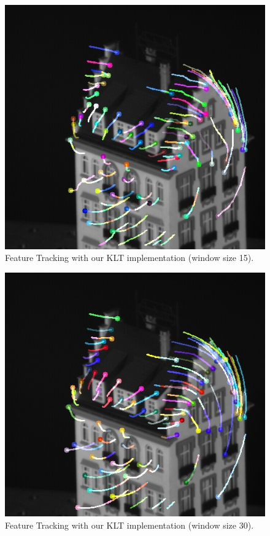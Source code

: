 \documentclass[]{IEEEtran}
\begin{document}
\begin{figure}[h]
  \includegraphics[width=\linewidth]{./figures/klt/klt-own-w15-hotel.jpg}
  \caption{Feature Tracking with our KLT implementation (window size 15).}
  \label{fig:klt_own_w15}
\end{figure}

\begin{figure}[h]
  \includegraphics[width=\linewidth]{./figures/klt/klt-own-w30-hotel.jpg}
  \caption{Feature Tracking with our KLT implementation (window size 30).}
  \label{fig:klt_own_w30}
\end{figure}
\end{document}
